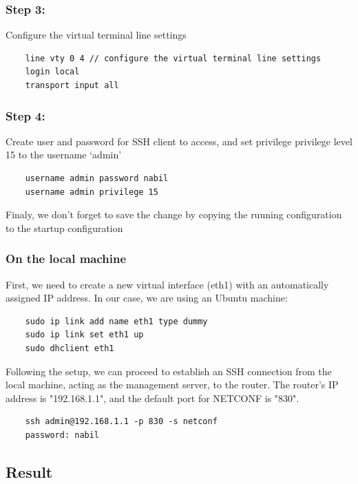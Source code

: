 \subsubsection{Step 3:}
Configure the virtual terminal line settings
\begin{verbatim}
    line vty 0 4 // configure the virtual terminal line settings
    login local
    transport input all
\end{verbatim}
\subsubsection{Step 4:}
Create user and password for SSH client to access, and set privilege privilege level 15 to the username ‘admin’
\begin{verbatim}
    username admin password nabil 
    username admin privilege 15 
\end{verbatim}
\indent Finaly, we don't forget to save the change by copying the ruuning configuration to the startup configuration
\subsubsection{On the local machine}
\indent First, we need to create a new virtual interface (eth1) with an automatically assigned IP address. In our case, we are using an Ubuntu machine:
\begin{verbatim}
    sudo ip link add name eth1 type dummy
    sudo ip link set eth1 up
    sudo dhclient eth1
\end{verbatim}
Following the setup, we can proceed to establish an SSH connection from the local machine, acting as the management server, to the router. The router's IP address is "192.168.1.1", and the default port for NETCONF is "830".
\begin{verbatim}
    ssh admin@192.168.1.1 -p 830 -s netconf 
    password: nabil
\end{verbatim}
\subsection{Result}
